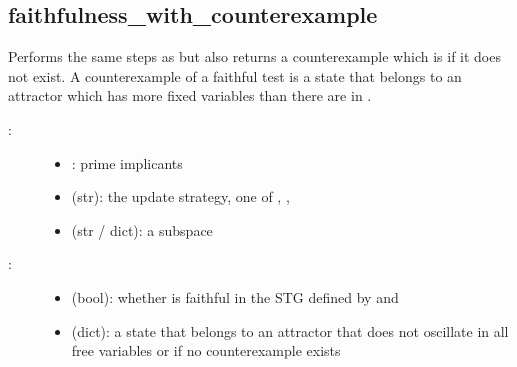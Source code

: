 \documentclass[letterpaper,10pt,english]{sphinxmanual}
\begin{document}
\subsection{faithfulness\_with\_counterexample}
\label{\detokenize{Attractors:faithfulness-with-counterexample}}\label{\detokenize{Attractors:id8}}

\begin{fulllineitems}
\label{\detokenize{Attractors:PyBoolNet.Attractors.faithfulness_with_counterexample}}
Performs the same steps as {\hyperref[\detokenize{Attractors:faithfulness}]{}} but also returns a counterexample which is  if it does not exist.
A counterexample of a faithful test is a state that belongs to an attractor which has more fixed variables than there are in .
\begin{description}
\item[{:}] \leavevmode\begin{itemize}
\item {} 
: prime implicants

\item {} 
 (str): the update strategy, one of , , 

\item {} 
 (str / dict): a subspace

\end{itemize}

\item[{:}] \leavevmode\begin{itemize}
\item {} 
 (bool): whether  is faithful in the STG defined by  and 

\item {} 
 (dict): a state that belongs to an attractor that does not oscillate in all free variables or  if no counterexample exists


\end{itemize}
\end{description}
\end{fulllineitems}
\end{document}
